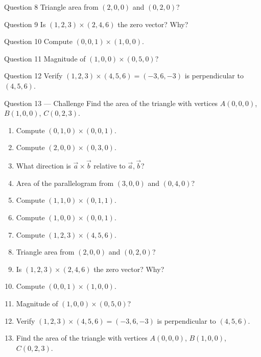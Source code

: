 \documentclass[11pt]{article}
\begin{document}
\begin{qbox}{Question 8}
Triangle area from $(2,0,0)$ and $(0,2,0)$?\workspace{2.4cm}
\end{qbox}

\begin{qbox}{Question 9}
Is $(1,2,3)\times(2,4,6)$ the zero vector? Why?\workspace{2.4cm}
\end{qbox}

\begin{qbox}{Question 10}
Compute $(0,0,1)\times(1,0,0)$.\workspace{2.4cm}
\end{qbox}

\begin{qbox}{Question 11}
Magnitude of $(1,0,0)\times(0,5,0)$?\workspace{2.4cm}
\end{qbox}

\begin{qbox}{Question 12}
Verify $(1,2,3)\times(4,5,6)=(-3,6,-3)$ is perpendicular to $(4,5,6)$.\workspace{2.4cm}
\end{qbox}

\begin{qbox}{Question 13 --- Challenge}
Find the area of the triangle with vertices $A(0,0,0)$, $B(1,0,0)$, $C(0,2,3)$.\workspace{3.5cm}
\end{qbox}

\clearpage
{}

\begin{recapbox}
\begin{multicols}{2}
\small
\begin{enumerate}[leftmargin=*,itemsep=3pt]
  \item Compute $(0,1,0)\times(0,0,1)$.
  \item Compute $(2,0,0)\times(0,3,0)$.
  \item What direction is $\vec a\times\vec b$ relative to $\vec a,\vec b$?
  \item Area of the parallelogram from $(3,0,0)$ and $(0,4,0)$?
  \item Compute $(1,1,0)\times(0,1,1)$.
  \item Compute $(1,0,0)\times(0,0,1)$.
  \item Compute $(1,2,3)\times(4,5,6)$.
  \item Triangle area from $(2,0,0)$ and $(0,2,0)$?
  \item Is $(1,2,3)\times(2,4,6)$ the zero vector? Why?
  \item Compute $(0,0,1)\times(1,0,0)$.
  \item Magnitude of $(1,0,0)\times(0,5,0)$?
  \item Verify $(1,2,3)\times(4,5,6)=(-3,6,-3)$ is perpendicular to $(4,5,6)$.
  \item Find the area of the triangle with vertices $A(0,0,0)$, $B(1,0,0)$, $C(0,2,3)$.
\end{enumerate}
\end{multicols}
\end{recapbox}
\end{document}
